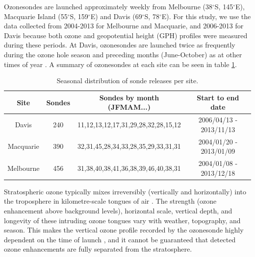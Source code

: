 \documentclass{article}
\begin{document}
    Ozonesondes are launched approximately weekly from Melbourne (38$^{\circ}$S, 145$^{\circ}$E), Macquarie Island (55$^{\circ}$S, 159$^{\circ}$E) and Davis (69$^{\circ}$S, 78$^{\circ}$E). 
    For this study, we use the data collected from 2004-2013 for Melbourne and Macquarie, and 2006-2013 for Davis because both ozone and geopotential height (GPH) profiles were measured during these periods.
    At Davis, ozonesondes are launched twice as frequently during the ozone hole season and preceding months (June-October) as at other times of year \citep{Alexander2013}.
    A summary of ozonesondes at each site can be seen in table \ref{table:sondesummary}.
    
    \begin{table}[htbp!]
      \centering
      \caption{Seasonal distribution of sonde releases per site.}
      \begin{tabular}{| c | c | c | c |} 
	\hline
	Site & Sondes & Sondes by month (JFMAM...) & Start to end date \\
	\hline
	Davis     & 240 & 11,12,13,12,17,31,29,28,32,28,15,12 & 2006/04/13 - 2013/11/13  \\ 
	Macquarie & 390 & 32,31,45,28,34,33,28,35,29,33,31,31 & 2004/01/20 - 2013/01/09 \\
	Melbourne & 456 & 31,38,40,38,41,36,38,39,46,40,38,31 & 2004/01/08 - 2013/12/18 \\
	\hline
      \end{tabular}
      \label{table:sondesummary}
    \end{table}
    
    Stratospheric ozone typically mixes irreversibly (vertically and horizontally) into the troposphere in kilometre-scale tongues of air \citep{Frey2015}.
    The strength (ozone enhancement above background levels), horizontal scale, vertical depth, and longevity of these intruding ozone tongues vary with weather, topography, and season.
    This makes the vertical ozone profile recorded by the ozonesonde highly dependent on the time of launch \citep{Sprenger2003}, and it cannot be guaranteed that detected ozone enhancements are fully separated from the stratosphere.
    
\end{document}
